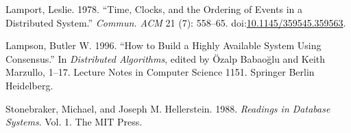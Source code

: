 \documentclass[]{article}
\begin{document}
Lamport, Leslie. 1978. ``Time, Clocks, and the Ordering of Events in a
Distributed System.'' \emph{Commun. ACM} 21 (7): 558--65.
doi:\href{http://dx.doi.org/10.1145/359545.359563}{10.1145/359545.359563}.

Lampson, Butler W. 1996. ``How to Build a Highly Available System Using
Consensus.'' In \emph{Distributed Algorithms}, edited by Özalp Babaoğlu
and Keith Marzullo, 1--17. Lecture Notes in Computer Science 1151.
Springer Berlin Heidelberg.

Stonebraker, Michael, and Joseph M. Hellerstein. 1988. \emph{Readings in
Database Systems}. Vol. 1. The MIT Press.


\end{document}
